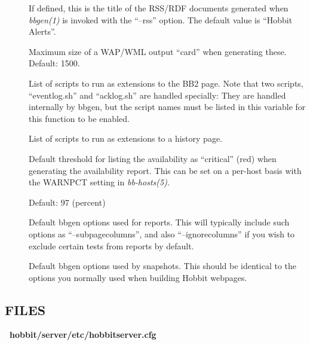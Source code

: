 \begin{description}
\item[] If defined, this is the title of the RSS/RDF documents generated when \emph{bbgen(1)}
 is invoked with the ``--rss'' option. The default value is ``Hobbit Alerts''. 

 

\item[] Maximum size of a WAP/WML output ``card'' when generating these. Default: 1500. 

 

\item[] List of scripts to run as extensions to the
  BB2 page. Note that two scripts, ``eventlog.sh'' and ``acklog.sh''
  are handled specially: They are handled internally by bbgen, but the
  script names must be listed in this variable for this function to be
  enabled. 


 

\item[] List of scripts to run as extensions to a history page. 

 

\item[] Default threshold for listing the
  availability as ``critical'' (red) when generating the availability
  report. This can be set on a per-host basis with the WARNPCT setting
  in \emph{bb-hosts(5).}

 Default: 97 (percent) 

 

\item[] Default bbgen options used for
  reports. This will typically include such options as
  ``--subpagecolumns'', and also ``--ignorecolumns'' if you wish to
  exclude certain tests from reports by default. 


 

\item[] Default bbgen options used by
  snapshots. This should be identical to the options you normally used
  when building Hobbit webpages. 



\end{description}

\subsection{FILES}
\textbf{~hobbit/server/etc/hobbitserver.cfg}



